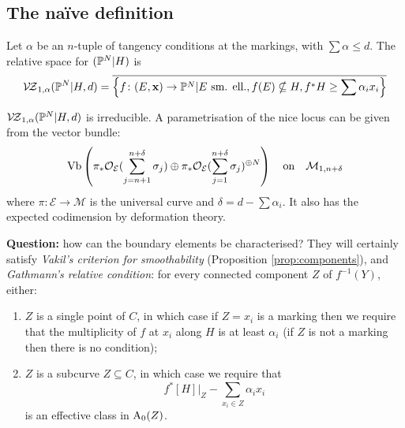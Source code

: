 \subsection{The na\"ive definition}
\begin{dfn}
 Let $\alpha$ be an $n$-tuple of tangency conditions at the markings, with $\sum\alpha\leq d$. The relative space for $(\mathbb P^N|H)$ is \[\mathcal{V\!Z}_{1,\alpha}(\mathbb P^N|H,d)=\overline{\left\{f\colon (E,\mathbf x)\rightarrow \mathbb P^N| E\text{ sm. ell.}, f(E)\nsubseteq H, f^*H\geq\sum\alpha_ix_i\right\}}\]
\end{dfn}
\begin{rmk}
 $\mathcal{V\!Z}_{1,\alpha}(\mathbb P^N|H,d)$ is irreducible. A parametrisation of the nice locus can be given from the vector bundle:
\[ \operatorname{Vb}\left(\pi_*\mathcal{O}_{\mathcal E}(\sum_{j=n+1}^{n+\delta}\sigma_j)\oplus\pi_*\mathcal{O}_{\mathcal E}(\sum_{j=1}^{n+\delta}\sigma_j)^{\oplus N}\right) \quad \text{on} \quad \mathcal{M}_{1,n+\delta}\]
where $\pi\colon\mathcal E\to\mathcal M$ is the universal curve and $\delta=d-\sum\alpha_i$. It also has the expected codimension by deformation theory.
\end{rmk}
\textbf{Question:} how can the boundary elements be characterised?
They will certainly satisfy \emph{Vakil's criterion for smoothability} (Proposition \ref{prop:components}), and \emph{Gathmann's relative condition}: for every connected component $Z$ of $f^{-1}(Y)$, either:
\begin{enumerate}
\item $Z$ is a single point of $C$, in which case if $Z=x_i$ is a marking then we require that the multiplicity of $f$ at $x_i$ along $H$ is at least $\alpha_i$ (if $Z$ is not a marking then there is no condition);
\item $Z$ is a subcurve $Z \subseteq C$, in which case we require that
\begin{equation*} f^*[H]|_Z -\sum_{x_i\in Z}\alpha_ix_i\end{equation*}
is an effective class in $\operatorname{A}_0(Z)$.
\end{enumerate}
